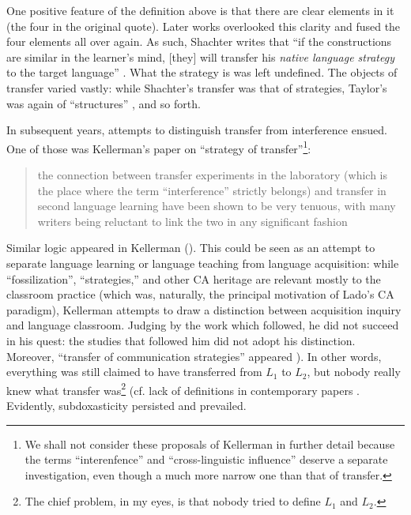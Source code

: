 \documentclass{article}
\begin{document}
One positive feature of the definition above is that there are clear elements in it (the four in the original quote). Later works overlooked this clarity and fused the four elements all over again. As such, Shachter writes that ``if the constructions are similar in the learner’s mind, [they] will transfer his \textit{native language strategy} to the target language'' \citep[][p. 212, emphasis added]{schachter_error_1974}. What the strategy is was left undefined. The objects of transfer varied vastly: while Shachter’s transfer was that of strategies, Taylor’s was again of ``structures'' \citep[][p. 75]{taylor_use_1975}, and so forth. 

In subsequent years, attempts to distinguish transfer from interference ensued. One of those was Kellerman’s paper on ``strategy of transfer''\footnote{We shall not consider these proposals of Kellerman in further detail because the terms ``interenfence'' and ``cross-linguistic influence'' deserve a separate investigation, even though a much more narrow one than that of transfer.}:

\begin{quote}
    the connection between transfer experiments  in the laboratory (which is the place where the term ``interference'' strictly belongs) and transfer in second language learning have been shown to be very tenuous, with many writers being reluctant to link the two in any significant fashion \citep[][p. 61]{kellerman_towards_1977}
\end{quote}

Similar logic appeared in Kellerman (\citeyear{kellerman_transfer_1979}). This could be seen as an attempt to separate language learning or language teaching from language acquisition: while ``fossilization'', ``strategies,'' and other CA heritage are relevant mostly to the classroom practice (which was, naturally, the principal motivation of Lado’s CA paradigm), Kellerman attempts to draw a distinction between acquisition inquiry and language classroom. Judging by the work which followed, he did not succeed in his quest: the studies that followed him did not adopt his distinction. Moreover, ``transfer of communication strategies'' appeared \citep[cf.][he also called it ``reflexation'']{zobl_developmental_1980}). In other words, everything was still claimed to have transferred from $L_1$ to $L_2$, but nobody really knew what transfer was\footnote{The chief problem, in my eyes, is that nobody tried to define $L_1$ and $L_2$.} (cf. lack of definitions in contemporary papers \citep[e.g.,][]{johnson_factors_1989}. Evidently, subdoxasticity persisted and prevailed. 
\end{document}
